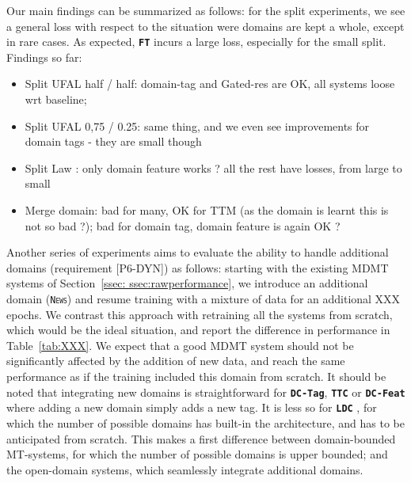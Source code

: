 \documentclass[11pt]{article}
\newcommand{\fyTodo}[1]{\Todo[FY:]{\textcolor{orange}{#1}}}
\newcommand{\domain}[1]{\texttt{\textsc{#1}}}
\newcommand{\system}[1]{\texttt{\textbf{#1}}}
\begin{document}
Our main findings can be summarized as follows: for the split experiments, we see a general loss with respect to the situation were domains are kept a whole, except in rare cases\fyTodo{To be completed}. As expected, \system{FT} incurs a large loss, especially for the small split. 
Findings so far:
\begin{itemize}
\item Split UFAL half / half: domain-tag and Gated-res are OK, all systems loose wrt baseline; 
\item Split UFAL 0,75 / 0.25: same thing, and we even see improvements for domain tags - they are small though
\item Split Law : only domain feature works ? all the rest have losses, from large to small
\item Merge domain: bad for many, OK for TTM (as the domain is learnt this is not so bad ?); bad for domain tag, domain feature is again OK ?
\end{itemize}

\fyTodo{We do need significance testing (a) each system against itself (non-split); (b) each system agains FT in split  condition}

Another series of experiments aims to evaluate the ability to handle additional domains (requirement [P6-DYN]) as follows: starting with the existing MDMT systems of Section~\ref{ssec: ssec:rawperformance}, we introduce an additional domain (\domain{News}) and resume training with a mixture of data for an additional XXX epochs. We contrast this approach with retraining all the systems from scratch, which would be the ideal situation, and report the difference in performance in Table~\ref{tab:XXX}. We expect that a good MDMT system should not be significantly affected by the addition of new data, and reach the same performance as if the training included this domain from scratch. It should be noted that integrating new domains is straightforward for \system{DC-Tag}, \system{TTC} or \system{DC-Feat} where adding a new domain simply adds a new tag. It is less so for \system{LDC} \fyTodo{Complete effect of new domain}, for which the number of possible domains has built-in the architecture, and has to be anticipated from scratch. This makes a first difference between domain-bounded MT-systems, for which the number of possible domains is upper bounded; and the open-domain systems, which seamlessly integrate additional domains.

\fyTodo{Instert table, significancy testing against full learning condition, for each domain}
\end{document}
